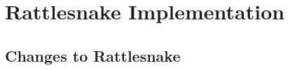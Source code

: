 \documentclass[8pt]{beamer}
\newcommand{\tcr}[1]{\textcolor{red}{#1}}
\newcommand{\tcb}[1]{\textcolor{blue}{#1}}
\newcommand{\tcm}[1]{\textcolor{magenta}{#1}}
\begin{document}
%
%
%
%
%

\section{Rattlesnake Implementation}

\subsection{Changes to Rattlesnake}
\end{document}
